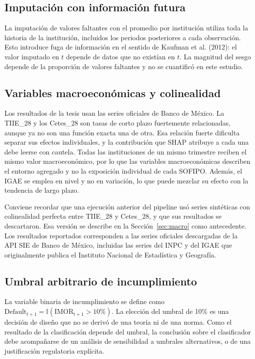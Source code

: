 \subsection{Imputación con información futura}\label{sec:imputacion}
La imputación de valores faltantes con el promedio por institución utiliza toda la historia de la institución, incluidos los periodos posteriores a cada observación. Esto introduce fuga de información en el sentido de Kaufman et al. (2012): el valor imputado en $t$ depende de datos que no existían en $t$. La magnitud del sesgo depende de la proporción de valores faltantes y no se cuantificó en este estudio.

\subsection{Variables macroeconómicas y colinealidad}\label{sec:limitaciones_macro}
Los resultados de la tesis usan las series oficiales de Banco de México. La TIIE\_28 y los Cetes\_28 son tasas de corto plazo fuertemente relacionadas, aunque ya no son una función exacta una de otra. Esa relación fuerte dificulta separar sus efectos individuales, y la contribución que SHAP atribuye a cada una debe leerse con cautela. Todas las instituciones de un mismo trimestre reciben el mismo valor macroeconómico, por lo que las variables macroeconómicas describen el entorno agregado y no la exposición individual de cada SOFIPO. Además, el IGAE se emplea en nivel y no en variación, lo que puede mezclar su efecto con la tendencia de largo plazo.

Conviene recordar que una ejecución anterior del pipeline usó series sintéticas con colinealidad perfecta entre TIIE\_28 y Cetes\_28, y que sus resultados se descartaron. Esa versión se describe en la Sección~\ref{sec:macro} como antecedente. Los resultados reportados corresponden a las series oficiales descargadas de la API SIE de Banco de México, incluidas las series del INPC y del IGAE que originalmente publica el Instituto Nacional de Estadística y Geografía.

\subsection{Umbral arbitrario de incumplimiento}
La variable binaria de incumplimiento se define como $\text{Default}_{t+1} = \mathbb{I}(\text{IMOR}_{t+1}>10\%)$. La elección del umbral de 10\% es una decisión de diseño que no se derivó de una teoría ni de una norma. Como el resultado de la clasificación depende del umbral, la conclusión sobre el clasificador debe acompañarse de un análisis de sensibilidad a umbrales alternativos, o de una justificación regulatoria explícita.%

